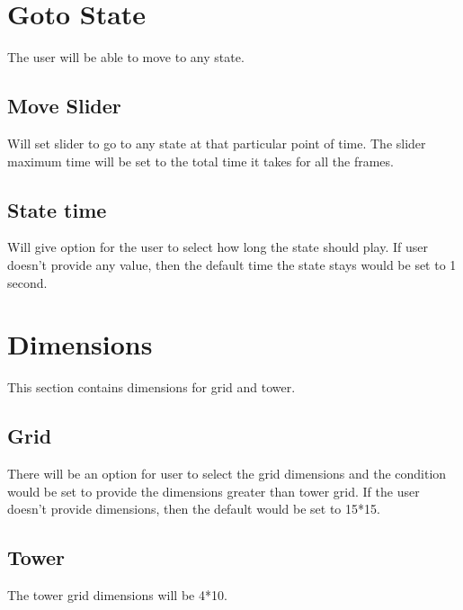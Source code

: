 \documentclass[12pt,a4paper]{article}
\begin{document}
\section{Goto State}
The user will be able to move to any state.
\subsection{Move Slider}
Will set slider to go to any state at that particular point of time. The slider maximum time will be set to the total time it takes for all the frames.
\subsection{State time}
Will give option for the user to select how long the state should play. If user doesn’t provide any value, then the default time the state stays would be set to 1 second.
\section{Dimensions}
This section contains dimensions for grid and tower.
\subsection{Grid}
There will be an option for user to select the grid dimensions and the condition would be set to provide the dimensions greater than tower grid. If the user doesn’t provide dimensions, then the default would be set to 15*15.
\subsection{Tower}
The tower grid dimensions will be 4*10.
\end{document}
